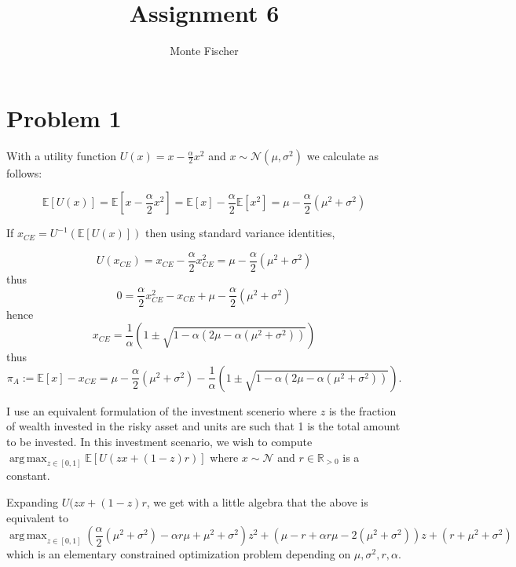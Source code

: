 \documentclass{article}
\title{Assignment 6}
\author{Monte Fischer}
\DeclareMathOperator*{\argmax}{arg\,max}
\begin{document}
\maketitle

\section*{Problem 1}


With a utility function $U(x) = x - \frac{\alpha}{2} x^2$ and $x \sim \mathcal{N}(\mu, \sigma^2)$ we calculate as follows:

\begin{equation}
    \mathbb{E}[U(x)] = \mathbb{E}[x - \frac{\alpha}{2} x^2] = \mathbb{E}[x] - \frac{\alpha}{2} \mathbb{E}[x^2] = \mu - \frac{\alpha}{2}(\mu^2 + \sigma^2)
\end{equation}

If $x_{CE} = U^{-1}(\mathbb{E}[U(x)])$ then using standard variance identities,

\begin{equation}
    U(x_{CE}) = x_{CE} - \frac{\alpha}{2} x_{CE}^2 = \mu - \frac{\alpha}{2} (\mu^2 + \sigma^2)
\end{equation}
thus
\begin{equation}
    0 = \frac{\alpha}{2} x_{CE}^2 - x_{CE} + \mu - \frac{\alpha}{2} (\mu^2 + \sigma^2)
\end{equation}
hence
\begin{equation}
    x_{CE} = \frac{1}{\alpha} \left(1 \pm \sqrt{1 - \alpha(2\mu - \alpha(\mu^2 + \sigma^2))}\right)
\end{equation}
thus
\begin{equation}
    \pi_A := \mathbb{E}[x] - x_{CE} = \mu - \frac{\alpha}{2}(\mu^2 + \sigma^2) - \frac{1}{\alpha} \left(1 \pm \sqrt{1 - \alpha(2\mu - \alpha(\mu^2 + \sigma^2))}\right).
\end{equation}

I use an equivalent formulation of the investment scenerio where $z$ is the fraction of wealth invested in the risky asset and units are such that 1 is the total amount to be invested.
In this investment scenario, we wish to compute $\argmax_{z\in[0,1]} \mathbb{E}[U(zx + (1-z)r)]$ where $x \sim \mathcal{N}$ and $r \in \mathbb{R}_{>0}$ is a constant. 

Expanding $U(zx+(1-z)r$, we get with a little algebra that the above is equivalent to
\begin{equation}
    \argmax_{z\in[0, 1]} \left( \frac{\alpha}{2} (\mu^2 + \sigma^2) - \alpha r \mu + \mu^2 + \sigma^2 \right) z^2 + (\mu - r + \alpha r\mu - 2(\mu^2 + \sigma^2))z + (r + \mu^2 + \sigma^2)
\end{equation}
which is an elementary constrained optimization problem depending on $\mu, \sigma^2, r, \alpha$.
\end{document}
